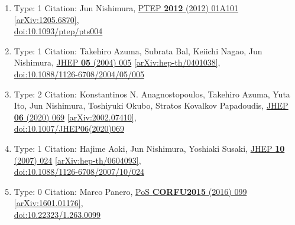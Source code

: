 \documentclass[a4paper,10pt]{article}
\begin{document}
\begin{enumerate}
\begin{enumerate}
  \item Type: 1 Citation: Jun Nishimura, \href{https://www.doi.org/10.1093/ptep/pts004}{PTEP {\bf 2012} (2012) 01A101}  \href{https://arxiv.org/abs/1205.6870}{[arXiv:1205.6870]},\\\href{https://www.doi.org/10.1093/ptep/pts004}{doi:10.1093/ptep/pts004}
  \item Type: 1 Citation: Takehiro Azuma, Subrata Bal, Keiichi Nagao, Jun Nishimura, \href{https://www.doi.org/10.1088/1126-6708/2004/05/005}{JHEP {\bf 05} (2004) 005}  \href{https://arxiv.org/abs/hep-th/0401038}{[arXiv:hep-th/0401038]},\\\href{https://www.doi.org/10.1088/1126-6708/2004/05/005}{doi:10.1088/1126-6708/2004/05/005}
  \item Type: 2 Citation: Konstantinos N. Anagnostopoulos, Takehiro Azuma, Yuta Ito, Jun Nishimura, Toshiyuki Okubo, Stratos Kovalkov Papadoudis, \href{https://www.doi.org/10.1007/JHEP06(2020)069}{JHEP {\bf 06} (2020) 069}  \href{https://arxiv.org/abs/2002.07410}{[arXiv:2002.07410]},\\\href{https://www.doi.org/10.1007/JHEP06(2020)069}{doi:10.1007/JHEP06(2020)069}
  \item Type: 1 Citation: Hajime Aoki, Jun Nishimura, Yoshiaki Susaki, \href{https://www.doi.org/10.1088/1126-6708/2007/10/024}{JHEP {\bf 10} (2007) 024}  \href{https://arxiv.org/abs/hep-th/0604093}{[arXiv:hep-th/0604093]},\\\href{https://www.doi.org/10.1088/1126-6708/2007/10/024}{doi:10.1088/1126-6708/2007/10/024}
  \item Type: 0 Citation: Marco Panero, \href{https://www.doi.org/10.22323/1.263.0099}{PoS {\bf CORFU2015} (2016) 099}  \href{https://arxiv.org/abs/1601.01176}{[arXiv:1601.01176]},\\\href{https://www.doi.org/10.22323/1.263.0099}{doi:10.22323/1.263.0099}

\end{enumerate}
\end{enumerate}
\end{document}
